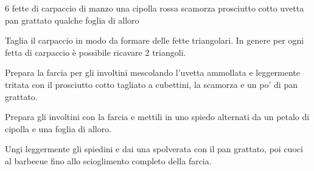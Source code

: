 \begin{ingreds}
	6 fette di carpaccio di manzo
	una cipolla rossa
	scamorza
	prosciutto cotto 
	uvetta
	pan grattato
	qualche foglia di alloro
\end{ingreds}

\begin{method}
	Taglia il carpaccio in modo da formare delle fette triangolari. In genere per ogni fetta di carpaccio è possibile ricavare 2 triangoli.

	Prepara la farcia per gli involtini mescolando l'uvetta ammollata e leggermente tritata con il prosciutto cotto tagliato a cubettini, la scamorza e un po' di pan grattato.

	Prepara gli involtini con la farcia e mettili in uno spiedo alternati da un petalo di cipolla e una foglia di alloro.

	Ungi leggermente gli  spiedini e dai una spolverata con il pan grattato, poi cuoci al barbecue fino allo scioglimento completo della farcia.

\end {method}


